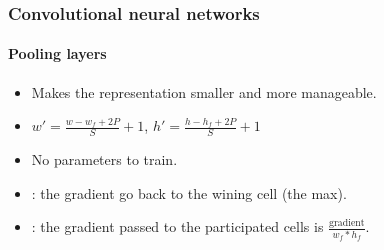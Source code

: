 \documentclass[xcolor=table]{beamer}
\begin{document}
\begin{frame}
\frametitle{Convolutional neural networks}
\framesubtitle{Pooling layers}

\begin{minipage}{0.60\textwidth} 
	\begin{itemize}
		\item Makes the representation smaller and more manageable.
		\item $ w' = \frac{w - w_f + 2P}{S} + 1$,  $ h' = \frac{h - h_f + 2P}{S} + 1$
		\item No parameters to train.
		\item {}: the gradient go back to the wining cell (the max).
		\item {}: the gradient passed to the participated cells is $\frac{\text{gradient}}{w_f * h_f}$. 
	\end{itemize}
\end{minipage}
%
\begin{minipage}{0.39\textwidth}
	
\end{minipage}

\end{frame}
\end{document}
